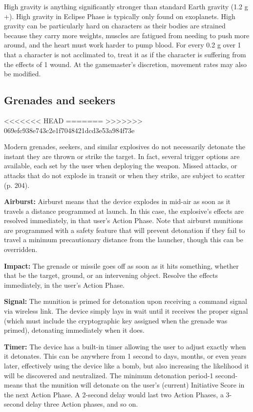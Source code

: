 High gravity is anything significantly stronger than standard Earth gravity (1.2 g +). High gravity in Eclipse Phase is typically only found on exoplanets. High gravity can be particularly hard on characters as their bodies are strained because they carry more weights, muscles are fatigued from needing to push more around, and the heart must work harder to pump blood. For every 0.2 g over 1 that a character is not acclimated to, treat it as if the character is suffering from the effects of 1 wound. At the gamemaster’s discretion, movement rates may also be modified. 

\subsection{Grenades and seekers} <<<<<<< HEAD \label{sec:grenades-seekers} ======= \label{sec:combat-grenades-seekers} >>>>>>> 069efc938e743c2e1f7048421dcd3e53a984f73e 

Modern grenades, seekers, and similar explosives do not necessarily detonate the instant they are thrown or strike the target. In fact, several trigger options are available, each set by the user when deploying the weapon. Missed attacks, or attacks that do not explode in transit or when they strike, are subject to scatter (p. 204). 

\textbf{Airburst:} Airburst means that the device explodes in mid-air as soon as it travels a distance programmed at launch. In this case, the explosive’s effects are resolved immediately, in that user’s Action Phase. Note that airburst munitions are programmed with a safety feature that will prevent detonation if they fail to travel a minimum precautionary distance from the launcher, though this can be overridden. 

\textbf{Impact:} The grenade or missile goes off as soon as it hits something, whether that be the target, ground, or an intervening object. Resolve the effects immediately, in the user’s Action Phase. 

\textbf{Signal:} The munition is primed for detonation upon receiving a command signal via wireless link. The device simply lays in wait until it receives the proper signal (which must include the cryptographic key assigned when the grenade was primed), detonating immediately when it does. 

\textbf{Timer:} The device has a built-in timer allowing the user to adjust exactly when it detonates. This can be anywhere from 1 second to days, months, or even years later, effectively using the device like a bomb, but also increasing the likelihood it will be discovered and neutralized. The minimum detonation period-1 second-means that the munition will detonate on the user’s (current) Initiative Score in the next Action Phase. A 2-second delay would last two Action Phases, a 3-second delay three Action phases, and so on. 


